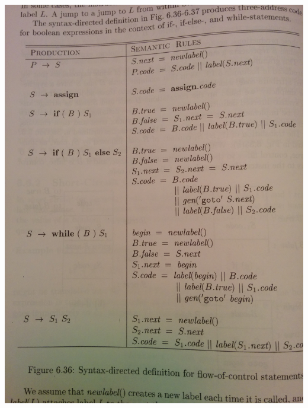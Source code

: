 \documentclass[11pt, oneside]{article}   	%
\begin{document}
\newpage

\includegraphics[scale=0.15]{IMG_20141029_013718.jpg}
\end{document}
